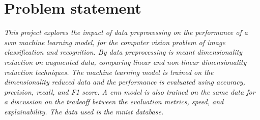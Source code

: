 \section{Problem statement}\label{sec:problem-statement}
\emph{This project explores the impact of data preprocessing on the performance of a \gls{svm} machine learning model, for the computer vision problem of image classification and recognition. By data preprocessing is meant dimensionality reduction on augmented data, comparing linear and non-linear dimensionality reduction techniques. The machine learning model is trained on the dimensionality reduced data and the performance is evaluated using accuracy, precision, recall, and F1 score. A \gls{cnn} model is also trained on the same data for a discussion on the tradeoff between the evaluation metrics, speed, and explainability. The data used is the \gls{mnist} database.}